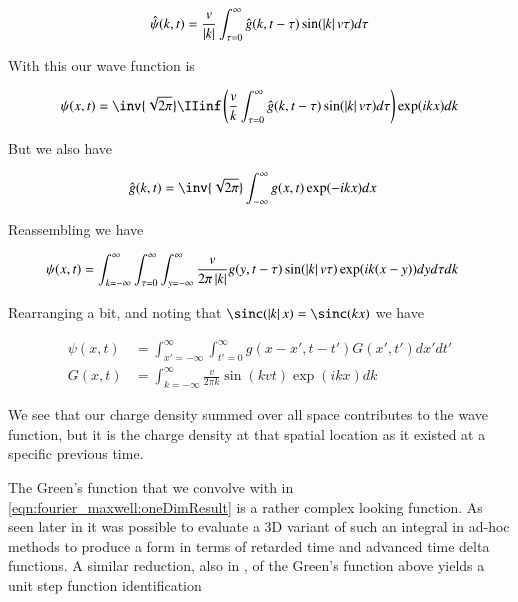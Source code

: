 \begin{align*}
\hat{\psi}(k, t) = \frac{v}{\left\lvert{k}\right\rvert} \int_{\tau = 0}^\infty \hat{g}(k, t-\tau) \sin( \left\lvert{k}\right\rvert v \tau ) d\tau
\end{align*}

With this our wave function is

\begin{align*}
{\psi}(x, t)
&=
\inv{\sqrt{2\pi}} \IIinf
\left(
\frac{v}{k} \int_{\tau = 0}^\infty \hat{g}(k, t-\tau) \sin( \Abs{k} v \tau ) d\tau
\right) \exp( i k x ) dk \\
\end{align*}


But we also have

\begin{align*}
\hat{g}(k,t) &= \inv{\sqrt{2\pi}} \int_{-\infty}^\infty {g}(x, t) \exp( -i k x ) dx
\end{align*}

Reassembling we have

\begin{align*}
{\psi}(x, t)
&= 
\int_{k = -\infty}^\infty
\int_{\tau = 0}^\infty
\int_{y=-\infty}^\infty
\frac{v}{ 2 \pi \left\lvert{k}\right\rvert}
{g}(y, t-\tau) 
\sin( \left\lvert{k}\right\rvert v \tau ) 
\exp( i k (x-y) ) 
dy
d\tau
dk
\end{align*}

Rearranging a bit, and noting that $\sinc(\Abs{k}x) = \sinc(kx)$ we have

\begin{align}\label{eqn:fourier_maxwell:oneDimResult}
{\psi}(x, t)
&=
\int_{x'=-\infty}^\infty
\int_{t' = 0}^\infty {g}(x-x', t-t') G(x', t') dx' dt' \\
G(x, t) &=
\int_{k = -\infty}^\infty
\frac{v}{2\pi {k}}
\sin( {k} v t )
\exp( i k x )
dk
\end{align}

We see that our charge density summed over all space contributes to the wave function, but it is the charge density at that spatial location as it existed at a specific previous time.

The Green's function that we convolve with in \ref{eqn:fourier_maxwell:oneDimResult}
is a rather complex looking function.  As seen later in 
 it was possible to evaluate a 3D variant of such an integral in
ad-hoc methods to produce a form in terms of retarded time and advanced time delta
functions.  A similar reduction, also in ,
of the Green's function above yields a unit step function identification

